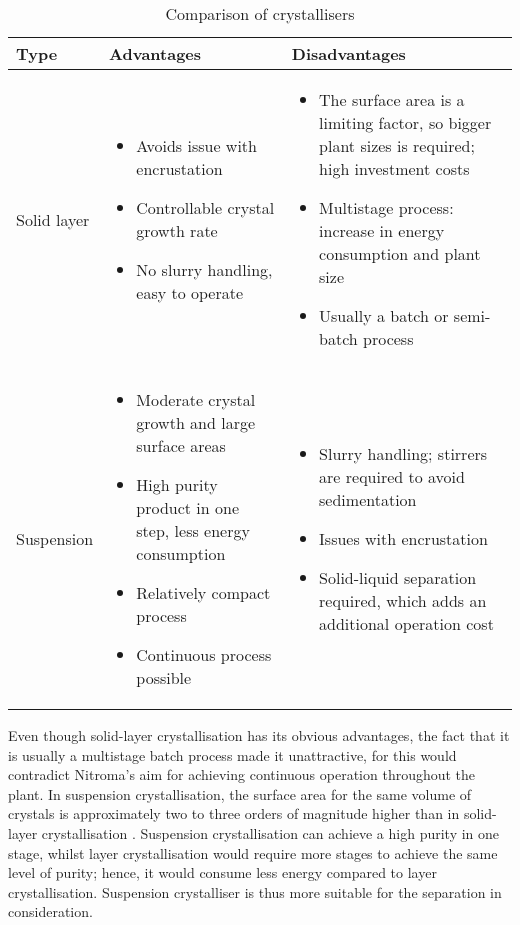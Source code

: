 \begin{table}
\caption{Comparison of crystallisers \cite{myerson_handbook_2019} }
\label{tab:crystallisertype}
\begin{tabularx}{\linewidth}{@{}lXX@{}}
\toprule
Type & Advantages                 & Disadvantages                               \\ \midrule
Solid layer & \begin{itemize}[label=+,leftmargin=1em]
  \item Avoids issue with encrustation
  \item Controllable crystal growth rate 
  \item No slurry handling, easy to operate
\end{itemize} & \begin{itemize}[label=-,leftmargin=1em]
  \item The surface area is a limiting factor, so bigger plant sizes is required; high investment costs
  \item Multistage process: increase in energy consumption and plant size 
  \item Usually a batch or semi-batch process
\end{itemize} \\\midrule 
Suspension &  \begin{itemize}[label=+,leftmargin=1em]
  \item Moderate crystal growth and large surface areas 
  \item High purity product in one step, less energy consumption
  \item Relatively compact process
  \item Continuous process possible
\end{itemize} & \begin{itemize}[label=-,leftmargin=1em]
  \item Slurry handling; stirrers are required to avoid sedimentation
  \item Issues with encrustation 
  \item Solid-liquid separation required, which adds an additional operation cost
\end{itemize}
\\\bottomrule
\end{tabularx}
\end{table}

Even though solid-layer crystallisation has its obvious advantages, the fact that it is usually a multistage batch process made it unattractive, for this would contradict Nitroma's aim for achieving continuous operation throughout the plant. In suspension crystallisation, the surface area for the same volume of crystals is approximately two to three orders of magnitude higher than in solid-layer crystallisation \cite{noauthor_types_nodate}. Suspension crystallisation can achieve a high purity in one stage, whilst layer crystallisation would require more stages to achieve the same level of purity; hence, it would consume less energy compared to layer crystallisation. Suspension crystalliser is thus more suitable for the separation in consideration. 

